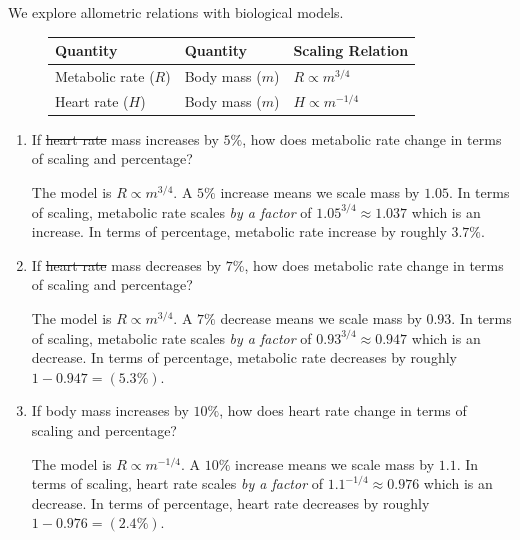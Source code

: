 \documentclass[../main.tex]{subfiles}
\begin{document}
\begin{exercise}
  We explore allometric relations with biological models. 

  \begin{figure}[H]
    \centering

    \begin{tabular}{l|l|l}
      Quantity & Quantity & Scaling Relation \\ \midrule\midrule
      Metabolic rate (\(R\)) & Body mass ($m$) & $R \propto m^{3/4}$ \\ \midrule
      Heart rate (\(H\)) & Body mass ($m$) & $H \propto m^{-1/4}$
    \end{tabular}
  \end{figure}

  \begin{enumerate}
    \item If \sout{heart rate} mass increases by \(5\%\), how does metabolic rate change in terms of scaling and percentage?
      \begin{solution}
        The model is \(R \propto m^{3/4}\). A \(5\%\) increase means we scale mass by \(1.05\). In terms of scaling, metabolic rate scales \emph{by a factor} of \(1.05^{3/4} \approx 1.037\) which is an increase. In terms of percentage, metabolic rate increase by roughly \(3.7\%\).
      \end{solution}

    \item If \sout{heart rate} mass decreases by \(7\%\), how does metabolic rate change in terms of scaling and percentage?
      \begin{solution}
        The model is \(R \propto m^{3/4}\). A \(7\%\) decrease means we scale mass by \(0.93\). In terms of scaling, metabolic rate scales \emph{by a factor} of \(0.93^{3/4} \approx 0.947\) which is an decrease. In terms of percentage, metabolic rate decreases by roughly \(1 - 0.947 = (5.3\%)\).
      \end{solution}

    \item If body mass increases by \(10\%\), how does heart rate change in terms of scaling and percentage?
      \begin{solution}
        The model is \(R \propto m^{-1/4}\). A \(10\%\) increase means we scale mass by \(1.1\). In terms of scaling, heart rate scales \emph{by a factor} of \(1.1^{-1/4} \approx 0.976\) which is an decrease. In terms of percentage, heart rate decreases by roughly \(1 - 0.976 = (2.4\%)\).


\end{solution}
\end{enumerate}
\end{exercise}
\end{document}
